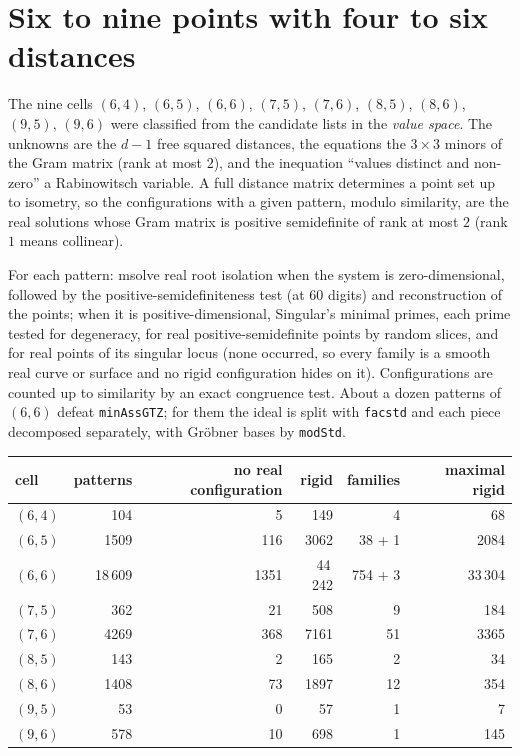 \documentclass[11pt]{amsart}
\theoremstyle{remark}
\begin{document}
\section{Six to nine points with four to six distances}\label{sec:middle}

The nine cells $(6,4)$, $(6,5)$, $(6,6)$, $(7,5)$, $(7,6)$, $(8,5)$, $(8,6)$, $(9,5)$, $(9,6)$ were
classified from the candidate lists in the \emph{value space}. The unknowns are the $d-1$ free squared
distances, the equations the $3\times3$ minors of the Gram matrix (rank at most $2$), and the inequation
``values distinct and non-zero'' a Rabinowitsch variable. A full distance matrix determines a point set up
to isometry, so the configurations with a given pattern, modulo similarity, are the real solutions whose
Gram matrix is positive semidefinite of rank at most $2$ (rank $1$ means collinear).

For each pattern: msolve real root isolation when the system is zero-dimensional, followed by the
positive-semidefiniteness test (at $60$ digits) and reconstruction of the points; when it is
positive-dimensional, Singular's minimal primes, each prime tested for degeneracy, for real
positive-semidefinite points by random slices, and for real points of its singular locus (none occurred, so
every family is a smooth real curve or surface and no rigid configuration hides on it). Configurations are
counted up to similarity by an exact congruence test. About a dozen patterns of $(6,6)$ defeat
\texttt{minAssGTZ}; for them the ideal is split with \texttt{facstd} and each piece decomposed separately,
with Gröbner bases by \texttt{modStd}.

\begin{center}
\begin{tabular}{@{}lrrrrr@{}}
\toprule
cell & patterns & no real configuration & rigid & families & maximal rigid\\
\midrule
$(6,4)$ & 104 & 5 & 149 & 4 & 68\\
$(6,5)$ & 1509 & 116 & 3062 & 38 + 1 & 2084\\
$(6,6)$ & 18\,609 & 1351 & 44\,242 & 754 + 3 & 33\,304\\
$(7,5)$ & 362 & 21 & 508 & 9 & 184\\
$(7,6)$ & 4269 & 368 & 7161 & 51 & 3365\\
$(8,5)$ & 143 & 2 & 165 & 2 & 34\\
$(8,6)$ & 1408 & 73 & 1897 & 12 & 354\\
$(9,5)$ & 53 & 0 & 57 & 1 & 7\\
$(9,6)$ & 578 & 10 & 698 & 1 & 145\\
\bottomrule
\end{tabular}
\end{center}
\end{document}
